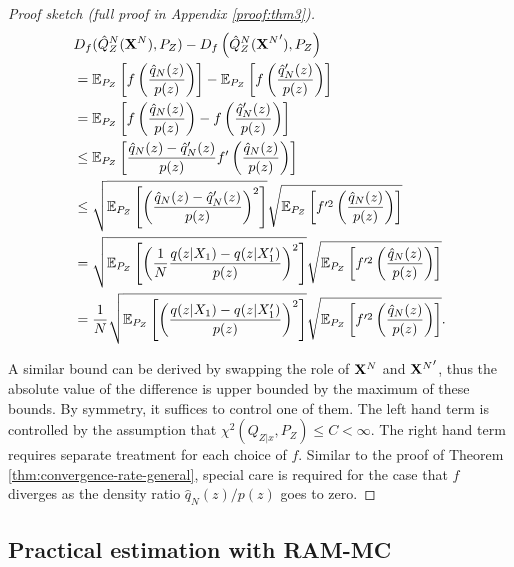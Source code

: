 \begin{proof}[Proof sketch (full proof in Appendix \ref{proof:thm3})]
\begin{align*}
& D_f( \hat{Q}_Z^N(\mathbf{X}^N) , P_Z) - D_f\left( \hat{Q}_Z^N({\mathbf{X}^N}') , P_Z\right) \\
&= \mathbb{E}_{P_Z} \left[ f\left( \frac{\hat{q}_N(z)}{p(z)} \right) \right] - \mathbb{E}_{P_Z} \left[ f\left( \frac{\hat{q}_N'(z)}{p(z)}\right)\right] \\
&= \mathbb{E}_{P_Z} \left[ f\left( \frac{\hat{q}_N(z)}{p(z)} \right) - f\left( \frac{\hat{q}_N'(z)}{p(z)}\right)\right] \\
&\leq \mathbb{E}_{P_Z} \left[ \frac{\hat{q}_N(z) - \hat{q}_N'(z)}{p(z)} f'\left(\frac{\hat{q}_N(z)}{p(z)}\right) \right] \\
&\leq \sqrt{ \mathbb{E}_{P_Z} \left[ \left( \frac{\hat{q}_N(z) - \hat{q}_N'(z)}{p(z)} \right)^2 \right]} \sqrt{ \mathbb{E}_{P_Z} \left[ f'^2\left(\frac{\hat{q}_N(z)}{p(z)}\right) \right]} \\
&= \sqrt{ \mathbb{E}_{P_Z} \left[ \left( \frac{1}{N}\frac{q(z|X_1) - q(z|X_1')}{p(z)} \right)^2 \right]} \sqrt{ \mathbb{E}_{P_Z} \left[ f'^2\left(\frac{\hat{q}_N(z)}{p(z)}\right) \right]} \\
&= \frac{1}{N} \sqrt{ \mathbb{E}_{P_Z} \left[ \left( \frac{q(z|X_1) - q(z|X_1')}{p(z)} \right)^2 \right]} \sqrt{ \mathbb{E}_{P_Z} \left[ f'^2\left(\frac{\hat{q}_N(z)}{p(z)}\right) \right]}.
\end{align*}

A similar bound can be derived by swapping the role of $\mathbf{X}^N$ and ${\mathbf{X}^N}'$, thus the absolute value of the difference is upper bounded by the maximum of these bounds.
By symmetry, it suffices to control one of them.
The left hand term is controlled by the assumption that ${\chi^2\left(Q_{Z|x} , P_Z\right) \leq C < \infty}$.
The right hand term requires separate treatment for each choice of $f$. 
Similar to the proof of Theorem \ref{thm:convergence-rate-general}, special care is required for the case that $f$ diverges as the density ratio $\hat{q}_N(z)/p(z)$ goes to zero.
\end{proof}

\subsection{Practical estimation with RAM-MC}

